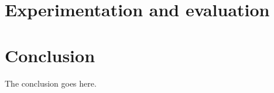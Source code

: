 \documentclass[conference]{IEEEtran}
\begin{document}



\section{Experimentation and evaluation}

\section{Conclusion}
The conclusion goes here.




\end{document}
